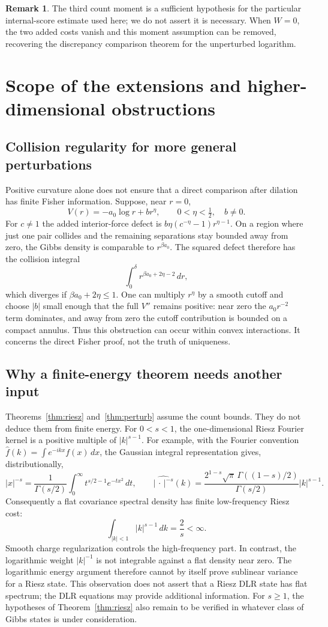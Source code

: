 \documentclass[11pt,reqno]{amsart}
\numberwithin{equation}{section}
\theoremstyle{definition}
\newtheorem{remark}[theorem]{Remark}
\newcommand{\1}{\mathbf 1}
\newcommand{\dd}{\,d}
\begin{document}
\begin{remark}
The third count moment is a sufficient hypothesis for the particular
internal-score estimate used here; we do not assert it is necessary.
When $W=0$, the two added costs vanish and this moment assumption can
be removed, recovering the discrepancy comparison theorem for the
unperturbed logarithm.
\end{remark}


\section{Scope of the extensions and higher-dimensional obstructions}
\label{sec:limits}

\subsection{Collision regularity for more general perturbations}
Positive curvature alone does not ensure that a direct comparison
after dilation has finite Fisher information. Suppose, near $r=0$,
\[
V(r)=-a_0\log r+b r^\eta,\qquad
0<\eta<\tfrac12,\quad b\ne0.
\]
For $c\ne1$ the added interior-force defect is
$b\eta(c^{-\eta}-1)r^{\eta-1}$. On a region where just one pair
collides and the remaining separations stay bounded away from zero,
the Gibbs density is comparable to $r^{\beta a_0}$. The squared
defect therefore has the collision integral
\[
\int_0^\delta r^{\beta a_0+2\eta-2}\dd r,
\]
which diverges if $\beta a_0+2\eta\le1$.
One can multiply $r^\eta$ by a smooth cutoff and choose $|b|$
small enough that the full $V''$ remains positive: near zero the
$a_0r^{-2}$ term dominates, and away from zero the cutoff contribution
is bounded on a compact annulus. Thus this obstruction can occur
within convex interactions. It concerns the direct Fisher proof,
not the truth of uniqueness.

\subsection{Why a finite-energy theorem needs another input}
Theorems~\ref{thm:riesz} and~\ref{thm:perturb} assume the count bounds.
They do not deduce them from finite energy. For $0<s<1$, the
one-dimensional Riesz Fourier kernel is a positive multiple of
$|k|^{s-1}$. For example, with the Fourier convention
$\widehat f(k)=\int e^{-ikx}f(x)\dd x$, the Gaussian integral
representation gives, distributionally,
\[
|x|^{-s}=\frac1{\Gamma(s/2)}
\int_0^\infty t^{s/2-1}e^{-tx^2}\dd t,\qquad
\widehat{|\,\cdot\,|^{-s}}(k)
=\frac{2^{1-s}\sqrt\pi\,\Gamma((1-s)/2)}{\Gamma(s/2)}
|k|^{s-1}.
\]
Consequently a flat covariance spectral density has finite
low-frequency Riesz cost:
\[
\int_{|k|<1}|k|^{s-1}\dd k=\frac2s<\infty.
\]
Smooth charge regularization controls the high-frequency part.
In contrast, the logarithmic weight $|k|^{-1}$ is not integrable
against a flat density near zero. The logarithmic energy argument
therefore cannot by itself prove sublinear variance for a Riesz state.
This observation does not assert that a Riesz DLR state has flat
spectrum; the DLR equations may provide additional information.
For $s\ge1$, the hypotheses of Theorem~\ref{thm:riesz} also remain to be
verified in whatever class of Gibbs states is under consideration.
\end{document}

